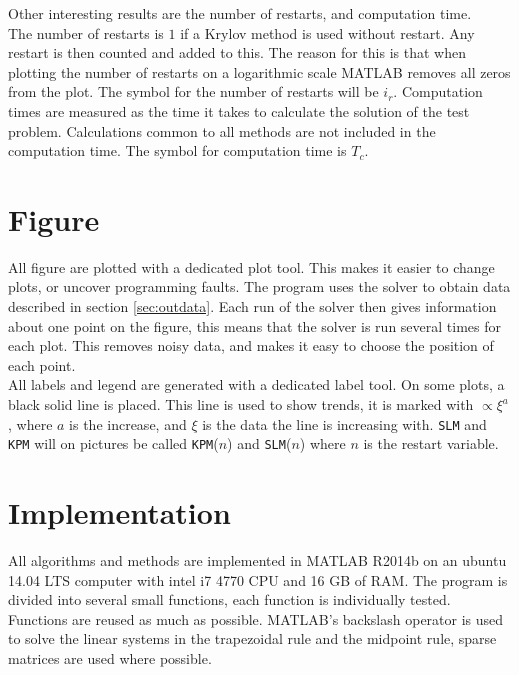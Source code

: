 \noindent Other interesting results are the number of restarts, and computation time. \\
The number of restarts is $1$ if a Krylov method is used without restart. Any restart is then counted and added to this. The reason for this is that when plotting the number of restarts on a logarithmic scale MATLAB removes all zeros from the plot. The symbol for the number of restarts will be $i_r$.
Computation times are measured as the time it takes to calculate the solution of the test problem. Calculations common to all methods are not included in the computation time.
The symbol for computation time is $T_c$.  \\

\section{Figure}%
All figure are plotted with a dedicated plot tool. This makes it easier to change plots, or uncover programming faults. The program uses the solver to obtain data described in section \ref{sec:outdata}. Each run of the solver then gives information about one point on the figure, this means that the solver is run several times for each plot. This removes noisy data, and makes it easy to choose the position of each point. \\

All labels and legend are generated with a dedicated label tool.
On some plots, a black solid line is placed. This line is used to show trends, it is marked with $\propto \xi^a$, where $a$ is the increase, and $\xi$ is the data the line is increasing with.
\texttt{SLM} and \texttt{KPM} will on pictures be called \texttt{KPM}($n$) and \texttt{SLM}($n$) where $n$ is the restart variable.




\section{Implementation} %
\label{sec:praktisk}
All algorithms and methods are implemented in MATLAB R2014b on an ubuntu 14.04 LTS computer with intel i7 4770 CPU and 16 GB of RAM. 
The program is divided into several small functions, each function is individually tested. Functions are reused as much as possible.
MATLAB's backslash operator is used to solve the linear systems in the trapezoidal rule and  the midpoint rule, sparse matrices are used where possible. \\

